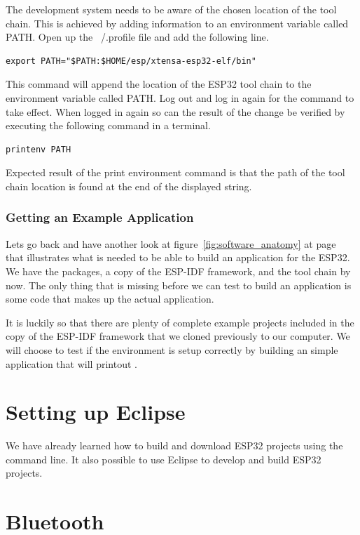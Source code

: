 \documentclass{tufte-book}
\begin{document}

The development system needs to be aware of the chosen location of the tool chain. This is achieved by adding information to an environment variable called PATH. Open up the ~/.profile file and add the following line.

\begin{lstlisting}
export PATH="$PATH:$HOME/esp/xtensa-esp32-elf/bin"
\end{lstlisting}

This command will append the location of the ESP32 tool chain to the environment variable called PATH. Log out and log in again for the command to take effect. When logged in again so can the result of the change be verified by executing the following command in a terminal.

\begin{lstlisting}
printenv PATH
\end{lstlisting}

Expected result of the print environment command is that the path of the tool chain location is found at the end of the displayed string.

\subsection{Getting an Example Application}
Lets go back and have another look at figure~\ref{fig:software_anatomy} at page~\pageref{fig:software_anatomy} that illustrates what is needed to be able to build an application for the ESP32. We have the packages, a copy of the ESP-IDF framework, and the tool chain by now. The only thing that is missing before we can test to build an application is some code that makes up the actual application.

It is luckily so that there are plenty of complete example projects included in the copy of the ESP-IDF framework that we cloned previously to our computer. We will choose to test if the environment is setup correctly by building an simple application that will printout .

\chapter{Setting up Eclipse}


We have already learned how to build and download ESP32 projects using the command line. It also possible to use Eclipse to develop and build ESP32 projects. 

\chapter{Bluetooth}
\end{document}

